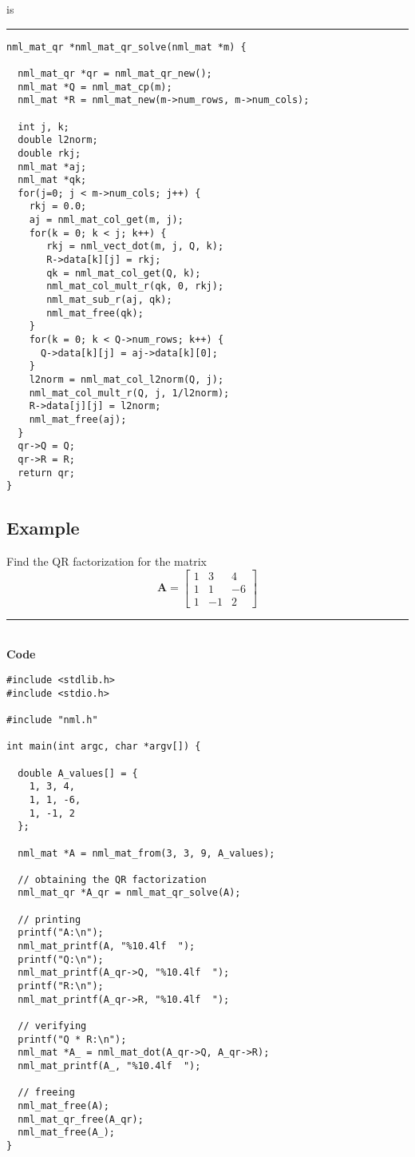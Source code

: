 is

\rule{\textwidth}{0.5pt}
\begin{verbatim}
nml_mat_qr *nml_mat_qr_solve(nml_mat *m) {

  nml_mat_qr *qr = nml_mat_qr_new();
  nml_mat *Q = nml_mat_cp(m);
  nml_mat *R = nml_mat_new(m->num_rows, m->num_cols);

  int j, k;
  double l2norm;
  double rkj;
  nml_mat *aj;
  nml_mat *qk;
  for(j=0; j < m->num_cols; j++) {    
    rkj = 0.0;
    aj = nml_mat_col_get(m, j);
    for(k = 0; k < j; k++) {
       rkj = nml_vect_dot(m, j, Q, k);
       R->data[k][j] = rkj;
       qk = nml_mat_col_get(Q, k);
       nml_mat_col_mult_r(qk, 0, rkj);
       nml_mat_sub_r(aj, qk);
       nml_mat_free(qk);
    }
    for(k = 0; k < Q->num_rows; k++) {
      Q->data[k][j] = aj->data[k][0];
    }
    l2norm = nml_mat_col_l2norm(Q, j);
    nml_mat_col_mult_r(Q, j, 1/l2norm);
    R->data[j][j] = l2norm;
    nml_mat_free(aj);
  }
  qr->Q = Q;
  qr->R = R;
  return qr;
} 
\end{verbatim}

\subsection{Example}

\textsf{
\example Find the QR factorization for the matrix
$$
\mathbf{A} = \left[
\begin{array}{rrr}
1 & 3 & 4 \\
1 & 1 & -6 \\
1 & -1 & 2
\end{array}
\right]
$$
}

\rule{80mm}{0.5pt}\\
{\bf Code}
\begin{verbatim}
#include <stdlib.h>
#include <stdio.h>

#include "nml.h"

int main(int argc, char *argv[]) {

  double A_values[] = {
    1, 3, 4,
    1, 1, -6,
    1, -1, 2
  };

  nml_mat *A = nml_mat_from(3, 3, 9, A_values);

  // obtaining the QR factorization
  nml_mat_qr *A_qr = nml_mat_qr_solve(A);

  // printing
  printf("A:\n");
  nml_mat_printf(A, "%10.4lf  ");
  printf("Q:\n");
  nml_mat_printf(A_qr->Q, "%10.4lf  ");
  printf("R:\n");
  nml_mat_printf(A_qr->R, "%10.4lf  ");

  // verifying
  printf("Q * R:\n");
  nml_mat *A_ = nml_mat_dot(A_qr->Q, A_qr->R);
  nml_mat_printf(A_, "%10.4lf  ");  

  // freeing
  nml_mat_free(A); 
  nml_mat_qr_free(A_qr);
  nml_mat_free(A_);
}
\end{verbatim}

